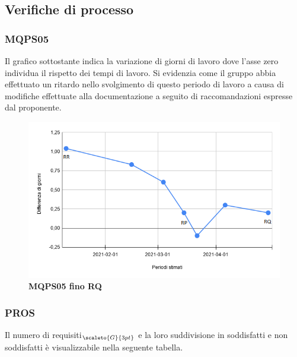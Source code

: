{{{{\subsection{Verifiche di processo}\label{ResocontoAttivitàDiVerificaRevisioneDiQualificaVerificheDiProcesso}

\subsubsection{MQPS05}\label{ResocontoAttivitàDiVerificaRevisioneDiQualificaVerificheDiProcessoMPQS05}

Il grafico sottostante indica la variazione di giorni di lavoro dove l'asse zero individua il rispetto dei tempi di lavoro. Si evidenzia come il gruppo abbia effettuato un ritardo nello svolgimento di questo periodo di lavoro a causa di modifiche effettuate alla documentazione a seguito di raccomandazioni espresse dal proponente.
\begin{center}
	\begin{figure}[H]
		\includegraphics[width=1\linewidth]{../immagini/Metriche/MQPS05_RQ.png}
		\caption{\textbf{MQPS05 fino RQ}}
	\end{figure}
\end{center}

\subsubsection{PROS}\label{ResocontoAttivitàDiVerificaRevisioneDiQualificaVerificheDiProcessoPROS}

Il numero di requisiti$_{\scaleto{G}{3pt}}$ e la loro suddivisione in soddisfatti e non soddisfatti è visualizzabile nella seguente tabella.

}}}}
